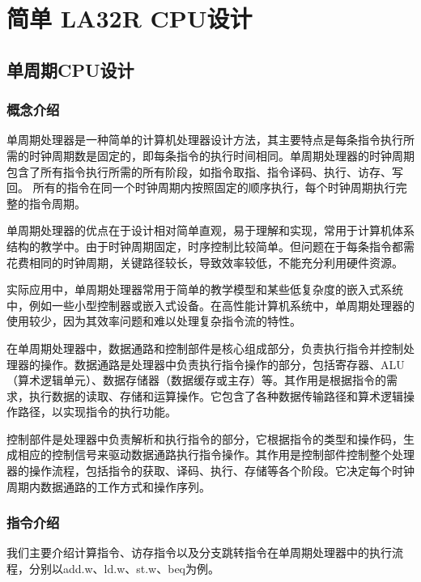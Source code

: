 
\chapter{简单 LA32R CPU设计}\label{chap:05-simple-cpu}

\section{单周期CPU设计}\label{sec:05-simple-cpu-001}

\subsection{概念介绍}\label{sec:05-simple-cpu-002}

单周期处理器是一种简单的计算机处理器设计方法，其主要特点是每条指令执行所需的时钟周期数是固定的，即每条指令的执行时间相同。单周期处理器的时钟周期包含了所有指令执行所需的所有阶段，如指令取指、指令译码、执行、访存、写回。
所有的指令在同一个时钟周期内按照固定的顺序执行，每个时钟周期执行完整的指令周期。

单周期处理器的优点在于设计相对简单直观，易于理解和实现，常用于计算机体系结构的教学中。由于时钟周期固定，时序控制比较简单。但问题在于每条指令都需花费相同的时钟周期，关键路径较长，导致效率较低，不能充分利用硬件资源。

实际应用中，单周期处理器常用于简单的教学模型和某些低复杂度的嵌入式系统中，例如一些小型控制器或嵌入式设备。在高性能计算机系统中，单周期处理器的使用较少，因为其效率问题和难以处理复杂指令流的特性。

在单周期处理器中，数据通路和控制部件是核心组成部分，负责执行指令并控制处理器的操作。数据通路是处理器中负责执行指令操作的部分，包括寄存器、ALU（算术逻辑单元）、数据存储器（数据缓存或主存）等。其作用是根据指令的需求，执行数据的读取、存储和运算操作。它包含了各种数据传输路径和算术逻辑操作路径，以实现指令的执行功能。

控制部件是处理器中负责解析和执行指令的部分，它根据指令的类型和操作码，生成相应的控制信号来驱动数据通路执行指令操作。其作用是控制部件控制整个处理器的操作流程，包括指令的获取、译码、执行、存储等各个阶段。它决定每个时钟周期内数据通路的工作方式和操作序列。

\subsection{指令介绍}\label{sec:05-simple-cpu-003}

我们主要介绍计算指令、访存指令以及分支跳转指令在单周期处理器中的执行流程，分别以add.w、ld.w、st.w、beq为例。

